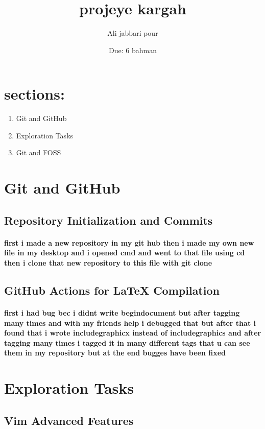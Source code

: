 \documentclass[titlepage]{article}
\title{projeye kargah}
\author{Ali jabbari pour}
\date{Due: 6 bahman}
\begin{document}
\maketitle
\tableofcontents
\newpage
\section{sections:}
\begin{enumerate}
    \item Git and GitHub
    \item Exploration Tasks
    \item Git and FOSS
\end{enumerate}
\fancyhead[L]{\thepage}
\newpage
\section{Git and GitHub}
\subsection{Repository Initialization and Commits}
\paragraph{\selectfont first i made a new repository in my git hub then i made my own new file in my
 desktop and i opened cmd and went to that file using cd then i clone that new repository to this file with git clone}
 \subsection{GitHub Actions for LaTeX Compilation }
 \paragraph{\selectfont first i had bug bec i didnt write begin{document} but after tagging many times and with my friends help i debugged that 
 but after that i found that i wrote includegraphicx instead of includegraphics and after tagging many times i tagged it in many different tags that u can see them in 
 my repository but at the end bugges have been fixed}
 \section{Exploration Tasks}
 \subsection{Vim Advanced Features}
\end{document}
